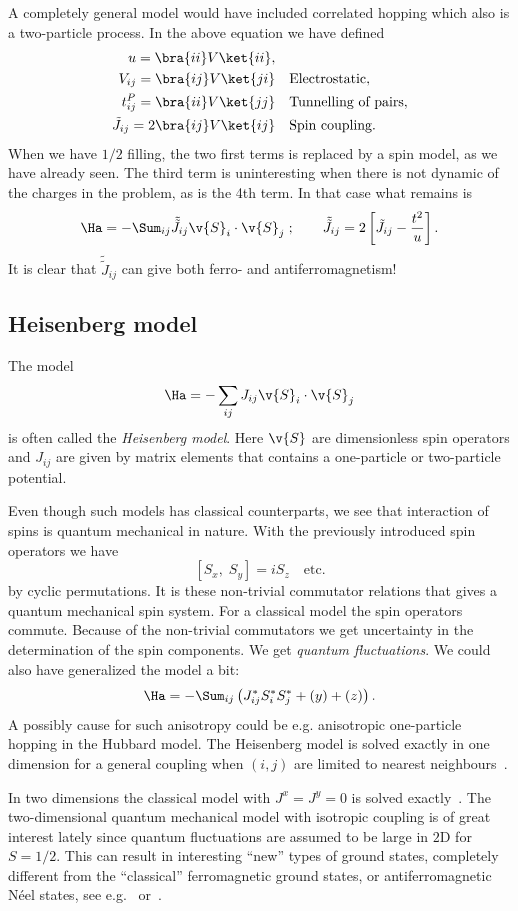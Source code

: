 A completely general model would have included correlated hopping which also is a two-particle process. In the above equation we have defined
\[
  \begin{aligned}
	u = \bra{ii}V\ket{ii},\quad&\\
	V_{ij} = \bra{ij}V\ket{ji}\quad&\text{Electrostatic},\\
	t_{ij}^P = \bra{ii}V\ket{jj}\quad&\text{Tunnelling of pairs},\\
	\tilde{J}_{ij} = 2\bra{ij}V\ket{ij}\quad&\text{Spin coupling}.
  \end{aligned}
\]
When we have $1/2$ filling, the two first terms is replaced by a spin model, as we have already seen. The third term is uninteresting when there is not dynamic of the charges in
the problem, as is the 4th term. In that case what remains is
\[\Ha = -\Sum_{ij}\tilde{\tilde{J}}_{ij}\v{S}_i\cdot\v{S}_j\;;\quad\quad\tilde{\tilde{J}}_{ij} = 2\left[ \tilde{J}_{ij} - \frac{t^2}{u} \right].\]
It is clear that $\tilde{\tilde{J}}_{ij}$ can give both ferro- and antiferromagnetism!

\subsection{Heisenberg model}
The model
\[\Ha = -\sum_{ij}J_{ij}\v{S}_i\cdot\v{S}_j\]
is often called the \emph{Heisenberg model}. Here $\v{S}$ are dimensionless spin operators and $J_{ij}$ are given by matrix elements that contains a one-particle or two-particle
potential.

Even though such models has classical counterparts, we see that interaction of spins is quantum mechanical in nature. With the previously introduced spin operators we have
\[ [S_x,\;S_y] = iS_z\quad\text{etc.} \]
by cyclic permutations. It is these non-trivial commutator relations that gives a quantum mechanical spin system. For a classical model the spin operators commute. Because of the
non-trivial commutators we get uncertainty in the determination of the spin components. We get \emph{quantum fluctuations}. We could also have generalized the model a bit:
\[ \Ha = -\Sum_{ij}\left( J_{ij}^\ast S_i^\ast S_j^\ast + (y) + (z) \right).\]
A possibly cause for such anisotropy could be e.g. anisotropic one-particle hopping in the Hubbard model. The Heisenberg model is solved exactly in one dimension 
for a general coupling when $(i,j)$
are limited to nearest neighbours~\cite{bethe1931}.

In two dimensions the classical model with $J^x = J^y = 0$ is solved exactly~\cite{onsager1943}. The two-dimensional quantum mechanical model with isotropic coupling is of great 
interest lately since quantum fluctuations are assumed to be large in $2$D for $S=1/2$. This can result in interesting ``new'' types of ground states, completely different from the
``classical'' ferromagnetic ground states, or antiferromagnetic N\'{e}el states, see e.g.~\cite{charkravarty1989} or~\cite{chubukov1993}.

